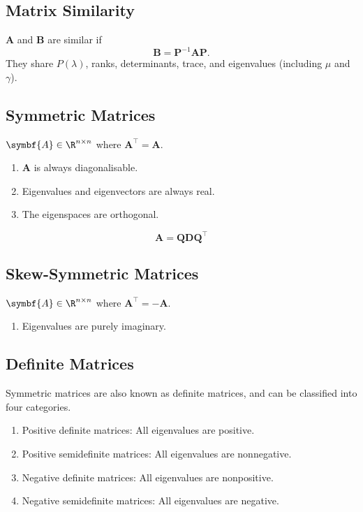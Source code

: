 \documentclass{article}
\begin{document}
\begin{multicols*}{3}
    \subsection{Matrix Similarity}
    \(\symbf{A}\) and \(\symbf{B}\) are similar if
    \begin{equation*}
        \symbf{B} = \symbf{P}^{-1} \symbf{A} \symbf{P}.
    \end{equation*}
    They share \(P(\lambda)\), ranks, determinants, trace, and eigenvalues (including \(\mu\) and \(\gamma\)).
    \subsection{Symmetric Matrices}
    \(\symbf{A}\in\R^{n \times n}\) where \(\symbf{A}^\top = \symbf{A}\).
    \begin{enumerate}
        \item \(\symbf{A}\) is always diagonalisable.
        \item Eigenvalues and eigenvectors are always real.
        \item The eigenspaces are orthogonal.
    \end{enumerate}
    \begin{equation*}
        \symbf{A} = \symbf{Q} \symbf{D} \symbf{Q}^\top
    \end{equation*}
    \subsection{Skew-Symmetric Matrices}
    \(\symbf{A}\in\R^{n \times n}\) where \(\symbf{A}^\top = -\symbf{A}\).
    \begin{enumerate}
        \item Eigenvalues are purely imaginary.
    \end{enumerate}
    \subsection{Definite Matrices}
    Symmetric matrices are also known as definite matrices, and can be classified into four categories.
    \begin{enumerate}
        \item Positive definite matrices: All eigenvalues are positive.
        \item Positive semidefinite matrices: All eigenvalues are nonnegative.
        \item Negative definite matrices: All eigenvalues are nonpositive.
        \item Negative semidefinite matrices: All eigenvalues are negative.
    \end{enumerate}


\end{multicols*}
\end{document}
